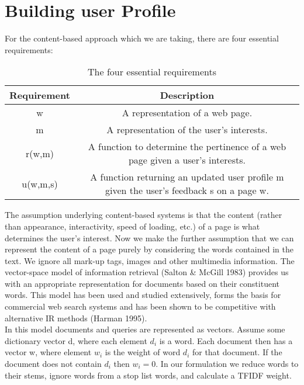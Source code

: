 \section{Building user Profile}
For the content-based approach which we are taking, there are four essential requirements:
\begin{table}[ht]
\caption{The four essential requirements} %
\centering  %
\begin{tabular}{c c} %
\hline\hline                        %
Requirement & Description\\ [0.5ex] %
\hline                  %
w & A representation of a web page. \\ %
m & A representation of the user's interests.\\
r(w,m)& A function to determine the pertinence of a web page given a user's interests.\\
u(w,m,s)& A function returning an updated user profile m given the user's feedback s on a page w. \\[1ex]      %
\hline %
\end{tabular}
\label{table:2} %
\end{table}
The assumption underlying content-based systems is that the content (rather than appearance, interactivity, speed of loading, etc.) of a page is what determines the user's interest. Now we make the further assumption that we can represent the content of a page purely by considering the words contained in the text. We ignore all mark-up tags, images and other multimedia information.
The vector-space model of information retrieval (Salton & McGill 1983) provides us with an appropriate representation for documents based on their constituent words. This model has been used and studied extensively, forms the basis for commercial web search systems and has been shown to be competitive with alternative IR methods (Harman 1995).\\
In this model documents and queries are represented as vectors. Assume some dictionary vector d, where each element $d_i$ is a word. Each document then has a vector w, where element $w_i$ is the weight of word $d_i$ for that document. If the document does not contain $d_i$ then $w_i = 0$.
In our formulation we reduce words to their stems, ignore words from a stop list words, and calculate a TFIDF weight.\\
